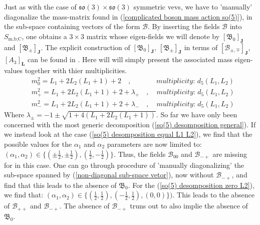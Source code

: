 %
%
Just as with the case of $\mathfrak{so}(3) \times \mathfrak{so}(3)$ symmetric vevs, we have to 'manually' diagonalize the mass-matrix found in (\ref{complicated boson mass action so(5)}), in the sub-space containing vectors of the form $\mathcal{B}$. By inserting the fields $\mathcal{B}$ into $S_{\text{m,b;C}}$, one obtains a $3 \times 3$ matrix whose eigen-fields we will denote by $[\mathfrak{B}_0]_{\mathbf{J}}$ and $[\mathfrak{B}_{\pm}]_{\mathbf{J}}$. The explicit construction of $[\mathfrak{B}_0]_{\mathbf{J}}$, $[\mathfrak{B}_{\pm}]_{\mathbf{J}}$ in terms of $[\mathcal{B}_{\pm, \mp}]_{\mathbf{J}}$, $[A_3]_{\mathbf{L}}$ can be found in \cite{One-point functions in D3-D7 SO(5)}. Here will will simply present the associated mass eigen-values together with thier multiplicities.
%
%
\begin{align}
& m^2_{0} = L_1 + 2 L_2 (L_1 + 1) + 2
%
\quad , \quad\quad\quad\;\;
%
\textit{multiplicity: } d_5(L_1, L_2)
\\
& m^2_{+} = L_1 + 2 L_2 (L_1 + 1) + 2 + \lambda_{+}
%
\quad , \quad
%
\textit{multiplicity: } d_5(L_1, L_2)
\\
& m^2_{-} = L_1 + 2 L_2 (L_1 + 1) + 2 + \lambda_{-}
%
\quad , \quad
%
\textit{multiplicity: } d_5(L_1, L_2)
\end{align}
%
%
Where $\lambda_{\pm} = -1 \pm \sqrt{1 + 4 (L_1 + 2 L_2 (L_1 + 1))}$. So far we have only been concerned with the most generic decomposition (\ref{so(5) desomposition general}). If we instead look at the case (\ref{so(5) desomposition equal L1 L2}), we find that the possible values for the $\alpha_1$ and $\alpha_2$ parameters are now limited to: $(\alpha_1, \alpha_2) \in \{ (\pm \tfrac{1}{2}, \pm \tfrac{1}{2}), (\tfrac{1}{2}, -\tfrac{1}{2}) \}$. Thus, the fields $\mathcal{B}_{00}$ and $\mathcal{B}_{-+}$ are missing for in this case. One can go through procedure of 'manually diagonalizing' the sub-space spanned by (\ref{non-diagonal sub-space vetor}), now without $\mathcal{B}_{-+}$, and find that this leads to the absence of $\mathfrak{B}_0$. For the (\ref{so(5) desomposition zero L2}), we find that: $(\alpha_1, \alpha_2) \in \{ (\tfrac{1}{2}, \tfrac{1}{2}), (-\tfrac{1}{2}, \tfrac{1}{2}), (0,0) \})$. This leads to the absence of $\mathcal{B}_{++}$ and $\mathcal{B}_{-+}$. The absence of $\mathcal{B}_{-+}$ truns out to also implie the absence of $\mathfrak{B}_0$.\\
%
%
